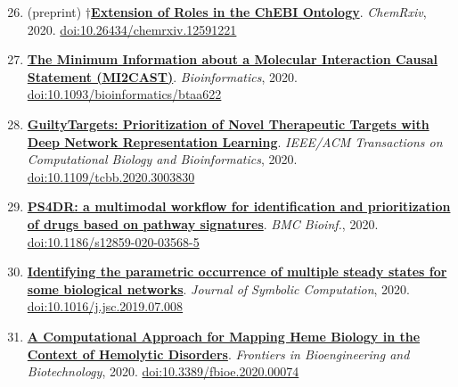 \documentclass[10pt,a4paper,sans]{moderncv} %
\newcommand{\wikidata}[2]{\href{https://bioregistry.io/wikidata:#1?provider=scholia}{{#2}}}
\begin{document}
    \begin{enumerate}
    \setcounter{enumi}{25}
    \itemsep0.5em
        \item
        (preprint) $\dagger$\wikidata{Q96909013}{\textbf{Extension of Roles in the ChEBI Ontology}}.
    \textit{ChemRxiv}, 2020.  {\scriptsize \href{https://bioregistry.io/doi:10.26434/CHEMRXIV.12591221}{doi:10.26434/chemrxiv.12591221}}
        \item
        \wikidata{Q97063807}{\textbf{The Minimum Information about a Molecular Interaction Causal Statement (MI2CAST)}}.
    \textit{Bioinformatics}, 2020.  {\scriptsize \href{https://bioregistry.io/doi:10.1093/BIOINFORMATICS/BTAA622}{doi:10.1093/bioinformatics/btaa622}}
        \item
        \wikidata{Q98200725}{\textbf{GuiltyTargets: Prioritization of Novel Therapeutic Targets with Deep Network Representation Learning}}.
    \textit{IEEE/ACM Transactions on Computational Biology and Bioinformatics}, 2020.  {\scriptsize \href{https://bioregistry.io/doi:10.1109/TCBB.2020.3003830}{doi:10.1109/tcbb.2020.3003830}}
        \item
        \wikidata{Q96169295}{\textbf{PS4DR: a multimodal workflow for identification and prioritization of drugs based on pathway signatures}}.
    \textit{BMC Bioinf.}, 2020.  {\scriptsize \href{https://bioregistry.io/doi:10.1186/S12859-020-03568-5}{doi:10.1186/s12859-020-03568-5}}
        \item
        \wikidata{Q118952373}{\textbf{Identifying the parametric occurrence of multiple steady states for some biological networks}}.
    \textit{Journal of Symbolic Computation}, 2020.  {\scriptsize \href{https://bioregistry.io/doi:10.1016/J.JSC.2019.07.008}{doi:10.1016/j.jsc.2019.07.008}}
        \item
        \wikidata{Q90643177}{\textbf{A Computational Approach for Mapping Heme Biology in the Context of Hemolytic Disorders}}.
    \textit{Frontiers in Bioengineering and Biotechnology}, 2020.  {\scriptsize \href{https://bioregistry.io/doi:10.3389/FBIOE.2020.00074}{doi:10.3389/fbioe.2020.00074}}
    \end{enumerate}
\end{document}
